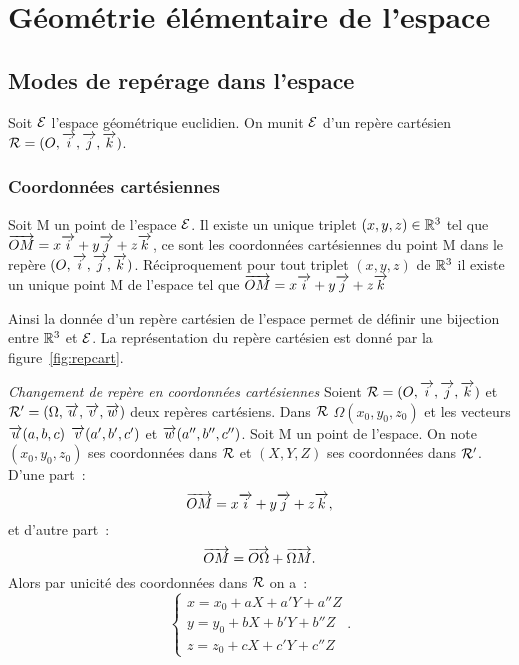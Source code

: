 \chapter{Géométrie élémentaire de l'espace}
\label{chap:geomEspace}
\minitoc
\minilof
\minilot
\section{Modes de repérage dans l'espace}
Soit \(\mathcal{E}\) l'espace géométrique euclidien. On munit \(\mathcal{E}\) d'un repère 
cartésien \(\mathcal{R} = (O,\overrightarrow{i},\overrightarrow{j},\overrightarrow{k})\).

\subsection{Coordonnées cartésiennes}
\begin{defdef}
  Soit M un point de l'espace \(\mathcal{E}\). Il existe un unique triplet \((x, y, 
  z)\in\mathbb{R}^3\) tel que \(\overrightarrow{OM}=x\overrightarrow{i} + y\overrightarrow{j} + z\overrightarrow{k}\), ce sont les coordonnées 
  cartésiennes du point M dans le repère \((O,\overrightarrow{i},\overrightarrow{j},\overrightarrow{k})\).  Réciproquement pour 
  tout triplet \((x, y, z)\) de \(\mathbb{R}^3\) il existe un unique point M de l'espace 
  tel que \(\overrightarrow{OM}=x\overrightarrow{i} + y\overrightarrow{j} + z\overrightarrow{k}\)
\end{defdef}
Ainsi la donnée d'un repère cartésien de l'espace permet de définir une 
bijection entre \(\mathbb{R}^3\) et \(\mathcal{E}\). La représentation du repère cartésien est 
donné par la figure~\ref{fig:repcart}.

\emph{Changement de repère en coordonnées cartésiennes}
Soient \(\mathcal{R} = (O,\overrightarrow{i},\overrightarrow{j},\overrightarrow{k})\) et \(\mathcal{R}'=(\Omega,\overrightarrow{u},\overrightarrow{v},\overrightarrow{w})\) deux repères cartésiens.  
Dans \(\mathcal{R}\) \(\Omega(x_0, y_0, z_0)\) et les vecteurs \(\overrightarrow{u}(a, b, c)\) 
\(\overrightarrow{v}(a',b',c')\) et \(\overrightarrow{w}(a'',b'',c'')\). Soit M un point de l'espace. On note 
\((x_0, y_0, z_0)\) ses coordonnées dans \(\mathcal{R}\) et \((X, Y, Z)\) ses 
coordonnées dans \(\mathcal{R}'\). D'une part~:
\begin{equation}
  \overrightarrow{OM}=x\overrightarrow{i} + y\overrightarrow{j} + z\overrightarrow{k},
\end{equation}
et d'autre part~:
\begin{equation}
  \overrightarrow{OM}=\overrightarrow{O\Omega}+\overrightarrow{\Omega M}.
\end{equation}
Alors par unicité des coordonnées dans \(\mathcal{R}\) on a~:
\begin{equation}
  \begin{cases}
    x = x_0 + aX + a'Y + a''Z\\
    y = y_0 + bX + b'Y + b''Z\\
    z = z_0 + cX + c'Y + c''Z
  \end{cases}.
\end{equation}

